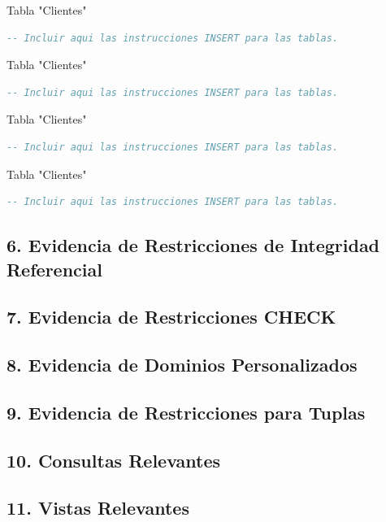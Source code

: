 \documentclass[12pt]{article}
\begin{document}
    Tabla "Clientes" 
    \begin{lstlisting}[language=SQL]
        -- Incluir aqui las instrucciones INSERT para las tablas.
    \end{lstlisting}

    Tabla "Clientes" 
    \begin{lstlisting}[language=SQL]
        -- Incluir aqui las instrucciones INSERT para las tablas.
    \end{lstlisting}

    Tabla "Clientes" 
    \begin{lstlisting}[language=SQL]
        -- Incluir aqui las instrucciones INSERT para las tablas.
    \end{lstlisting}

    Tabla "Clientes" 
    \begin{lstlisting}[language=SQL]
        -- Incluir aqui las instrucciones INSERT para las tablas.
    \end{lstlisting}

    \subsection*{6. Evidencia de Restricciones de Integridad Referencial}

    \subsection*{7. Evidencia de Restricciones CHECK}
    
    \subsection*{8. Evidencia de Dominios Personalizados}
    
    \subsection*{9. Evidencia de Restricciones para Tuplas}
    
    \subsection*{10. Consultas Relevantes}
    
    \subsection*{11. Vistas Relevantes}
\end{document}
